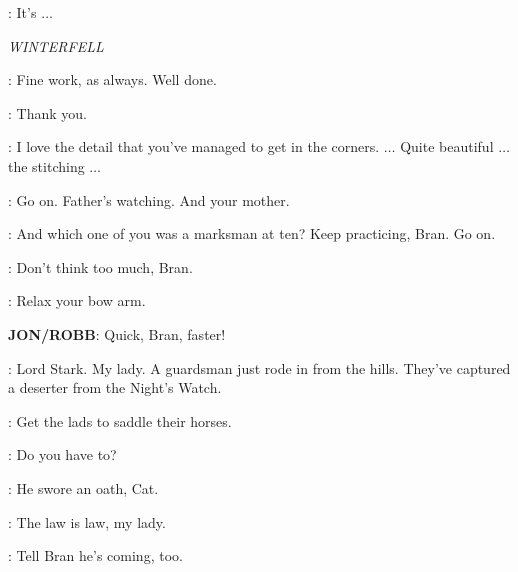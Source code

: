 \GARED: It's $\ldots$ 



\scene

\textit{WINTERFELL} 


\SEPTAMORDANE: Fine work, as always. Well done. 

\SANSA: Thank you. 

\SEPTAMORDANE: I love the detail that you've managed to get in the corners. $\ldots$ Quite beautiful $\ldots$ the stitching $\ldots$ 


\JON: Go on. Father's watching. And your mother. 


\NED: And which one of you was a marksman at ten? Keep practicing, Bran. Go on. 

\JON: Don't think too much, Bran. 

\ROBB: Relax your bow arm. 


\textbf{JON/ROBB}: Quick, Bran, faster! 


\RODRIK: Lord Stark. My lady. A guardsman just rode in from the hills. They've captured a deserter from the Night's Watch. 

\NED: Get the lads to saddle their horses. 

\CATELYN: Do you have to? 

\NED: He swore an oath, Cat. 

\RODRIK: The law is law, my lady. 

\NED: Tell Bran he's coming, too. 


